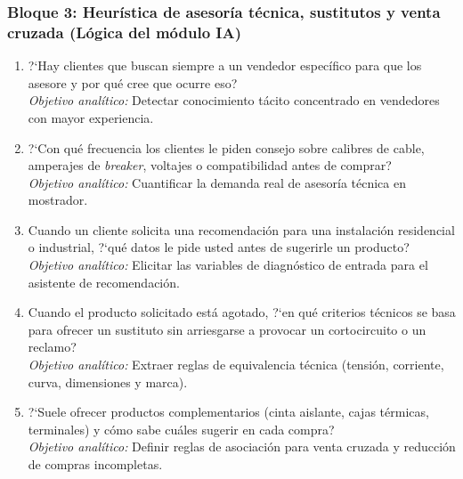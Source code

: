 \subsubsection*{Bloque 3: Heur\'istica de asesor\'ia t\'ecnica, sustitutos y venta cruzada (L\'ogica del m\'odulo IA)}
\begin{enumerate}[label=\textbf{P\arabic*.},resume,leftmargin=26pt,itemsep=3pt]
    \item ?`Hay clientes que buscan siempre a un vendedor espec\'ifico para que los asesore y por qu\'e cree que ocurre eso?\\
    {\footnotesize\textit{Objetivo anal\'itico:} Detectar conocimiento t\'acito concentrado en vendedores con mayor experiencia.}
    \item ?`Con qu\'e frecuencia los clientes le piden consejo sobre calibres de cable, amperajes de \emph{breaker}, voltajes o compatibilidad antes de comprar?\\
    {\footnotesize\textit{Objetivo anal\'itico:} Cuantificar la demanda real de asesor\'ia t\'ecnica en mostrador.}
    \item Cuando un cliente solicita una recomendaci\'on para una instalaci\'on residencial o industrial, ?`qu\'e datos le pide usted antes de sugerirle un producto?\\
    {\footnotesize\textit{Objetivo anal\'itico:} Elicitar las variables de diagn\'ostico de entrada para el asistente de recomendaci\'on.}
    \item Cuando el producto solicitado est\'a agotado, ?`en qu\'e criterios t\'ecnicos se basa para ofrecer un sustituto sin arriesgarse a provocar un cortocircuito o un reclamo?\\
    {\footnotesize\textit{Objetivo anal\'itico:} Extraer reglas de equivalencia t\'ecnica (tensi\'on, corriente, curva, dimensiones y marca).}
    \item ?`Suele ofrecer productos complementarios (cinta aislante, cajas t\'ermicas, terminales) y c\'omo sabe cu\'ales sugerir en cada compra?\\
    {\footnotesize\textit{Objetivo anal\'itico:} Definir reglas de asociaci\'on para venta cruzada y reducci\'on de compras incompletas.}
\end{enumerate}

